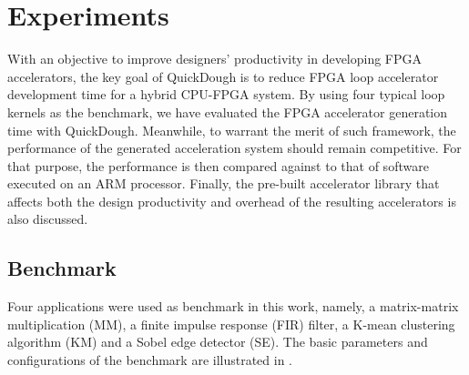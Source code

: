 \section{Experiments}\label{sec:experiments}
With an objective to improve designers' productivity in developing FPGA accelerators, the key goal
of QuickDough is to reduce FPGA loop accelerator development time for a hybrid CPU-FPGA system.
By using four typical loop kernels as the benchmark, we have evaluated the FPGA accelerator generation 
time with QuickDough. Meanwhile, to warrant the merit of such framework, the performance of the 
generated acceleration system should remain competitive. For that purpose, the performance is then 
compared against to that of software executed on an ARM processor. Finally, the pre-built accelerator 
library that affects both the design productivity and overhead of the resulting accelerators is also
discussed.


\subsection{Benchmark} \label{subsec:benchmark}
Four applications were used as benchmark in this work, namely, a matrix-matrix multiplication (MM), a
finite impulse response (FIR) filter, a K-mean clustering algorithm (KM) and a Sobel edge detector
(SE). The basic parameters and configurations of the benchmark are illustrated in 
. 

\begin{table}[htb]
    \centering
    \caption{Detailed Configurations of the Benchmark \label{tab:benchmark-config}}{
        \centering
    }
\vspace{-1em}
\end{table}

